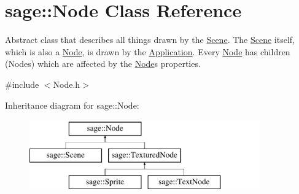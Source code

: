 \hypertarget{classsage_1_1Node}{}\section{sage\+::Node Class Reference}
\label{classsage_1_1Node}


Abstract class that describes all things drawn by the \mbox{\hyperlink{classsage_1_1Scene}{Scene}}. The \mbox{\hyperlink{classsage_1_1Scene}{Scene}} itself, which is also a \mbox{\hyperlink{classsage_1_1Node}{Node}}, is drawn by the \mbox{\hyperlink{classsage_1_1Application}{Application}}. Every \mbox{\hyperlink{classsage_1_1Node}{Node}} has children (Nodes) which are affected by the \mbox{\hyperlink{classsage_1_1Node}{Node}}\textquotesingle{}s properties.  




{\ttfamily \#include $<$Node.\+h$>$}

Inheritance diagram for sage\+::Node\+:\begin{figure}[H]
\begin{center}
\leavevmode
\includegraphics[height=3.000000cm]{classsage_1_1Node}
\end{center}
\end{figure}
